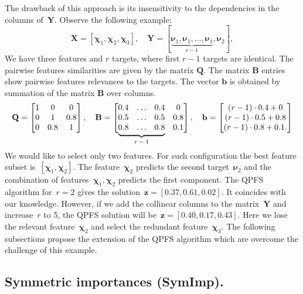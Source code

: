\documentclass[12pt,oneside]{article}
\theoremstyle{definition}
\newcommand{\bz}{\mathbf{z}}
\newcommand{\bb}{\mathbf{b}}
\newcommand{\bY}{\mathbf{Y}}
\newcommand{\bX}{\mathbf{X}}
\newcommand{\bB}{\mathbf{B}}
\newcommand{\bQ}{\mathbf{Q}}
\newcommand{\bchi}{\boldsymbol{\chi}}
\newcommand{\bnu}{\boldsymbol{\nu}}
\newcommand\undermat[2]{%
	\makebox[0pt][l]{$\smash{\underbrace{\phantom{%
					\begin{matrix}#2\end{matrix}}}_{\text{$#1$}}}$}#2}
\begin{document}
The drawback of this approach is its insensitivity to the dependencies in the columns of~$\bY$. Observe the following example:
\begin{equation}
	\bX = [\bchi_1, \bchi_2, \bchi_3], \quad \bY = [\underbrace{\bnu_1, \bnu_1, \dots, \bnu_1}_{r-1}, \bnu_2],
\end{equation}
We have three features and $r$ targets, where first $r-1$ targets are identical.
The pairwise features similarities are given by the matrix $\bQ$.
The matrix $\bB$ entries show pairwise features relevances to the targets.
The vector $\bb$ is obtained by summation of the matrix $\bB$ over columns.
\begin{equation}
	\bQ = \begin{bmatrix} 1 & 0 & 0\\ 0 & 1 & 0.8 \\ 0 & 0.8 & 1 \end{bmatrix}, \quad
	\bB = \begin{bmatrix} 0.4 & \dots & 0.4 & 0 \\ 0.5 & \dots & 0.5 & 0.8 \\ \undermat{r-1}{0.8 & \dots & 0.8} & 0.1 \end{bmatrix}, \quad
	\bb = \begin{bmatrix} (r-1) \cdot 0.4 + 0 \\ (r-1) \cdot 0.5 + 0.8 \\ (r-1) \cdot 0.8 + 0.1. \end{bmatrix}
	\label{eq:qpfs_example}
\end{equation}
	\vspace{0.5cm} \\
We would like to select only two features.
For such configuration the best feature subset is~$[\bchi_1, \bchi_2]$.
The feature~$\bchi_2$ predicts the second target~$\bnu_2$ and the combination of features~$\bchi_1, \bchi_2$ predicts the first component.
The QPFS algorithm for~$r=2$ gives the solution~$\bz = [0.37,	0.61,	0.02]$. It coincides with our knowledge.
However, if we add the collinear columns to the matrix~$\bY$ and increase~$r$ to 5, the QPFS solution will be~$\bz = [0.40,	0.17, 0.43]$.
Here we lose the relevant feature~$\bchi_2$ and select the redundant feature~$\bchi_3$.
The following subsections propose the extension of the QPFS algorithm which are overcome the challenge of this example.

\subsection{Symmetric importances (SymImp).}
\end{document}
